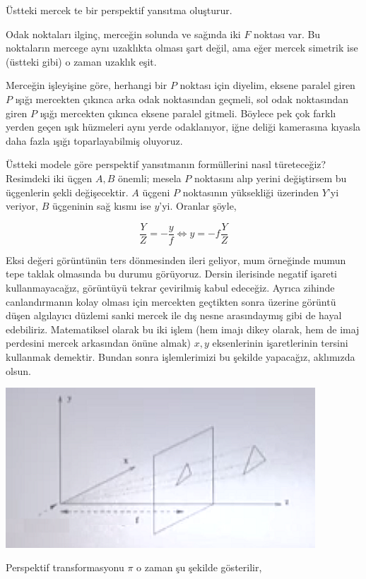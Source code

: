 \documentclass[12pt,fleqn]{article}\usepackage{../../common}
\begin{document}
Üstteki mercek te bir perspektif yansıtma oluşturur.

Odak noktaları ilginç, merceğin solunda ve sağında iki $F$ noktası var. Bu
noktaların mercege aynı uzaklıkta olması şart değil, ama eğer mercek
simetrik ise (üstteki gibi) o zaman uzaklık eşit. 

Merceğin işleyişine göre, herhangi bir $P$ noktası için diyelim, eksene
paralel giren $P$ ışığı mercekten çıkınca arka odak noktasından geçmeli,
sol odak noktasından giren $P$ ışığı mercekten çıkınca eksene paralel
gitmeli. Böylece pek çok farklı yerden geçen ışık hüzmeleri aynı yerde
odaklanıyor, iğne deliği kamerasına kıyasla daha fazla ışığı
toparlayabilmiş oluyoruz. 

Üstteki modele göre perspektif yansıtmanın formüllerini nasıl türeteceğiz?
Resimdeki iki üçgen $A,B$ önemli; mesela $P$ noktasını alıp yerini
değiştirsem bu üçgenlerin şekli değişecektir. $A$ üçgeni $P$ noktasının
yüksekliği üzerinden $Y$'yi veriyor, $B$ üçgeninin sağ kısmı ise
$y$'yi. Oranlar şöyle,

$$ \frac{Y}{Z} = -\frac{y}{f} \iff y = -f \frac{Y}{Z} $$

Eksi değeri görüntünün ters dönmesinden ileri geliyor, mum örneğinde mumun tepe
taklak olmasında bu durumu görüyoruz. Dersin ilerisinde negatif işareti
kullanmayacağız, görüntüyü tekrar çevirilmiş kabul edeceğiz. Ayrıca zihinde
canlandırmanın kolay olması için mercekten geçtikten sonra üzerine görüntü düşen
algılayıcı düzlemi sanki mercek ile dış nesne arasındaymış gibi de hayal
edebiliriz. Matematiksel olarak bu iki işlem (hem imajı dikey olarak, hem de
imaj perdesini mercek arkasından önüne almak) $x,y$ eksenlerinin işaretlerinin
tersini kullanmak demektir. Bundan sonra işlemlerimizi bu şekilde yapacağız,
aklımızda olsun.

\includegraphics[height=6cm]{front.png}

Perspektif transformasyonu $\pi$ o zaman şu şekilde gösterilir, 
\end{document}
